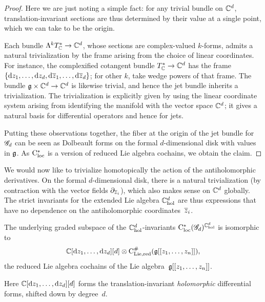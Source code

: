 
\begin{proof}
Here we are just noting a simple fact: 
for any trivial bundle on $\mathbb C^d$, 
translation-invariant sections are thus determined by their value at a single point,
which we can take to be the origin.

Each bundle $\Lambda^k T_\mathbb C^* \to \mathbb C^d$, whose sections are complex-valued $k$-forms, admits a natural trivialization by the frame arising from the choice of linear coordinates. 
For instance, the complexified cotangent bundle $T^*_\mathbb C \to \mathbb C^d$ has the frame $\{{\rm d} z_1,\ldots,{\rm d} z_d, {\rm d} \overline{z}_1,\ldots,{\rm d} \overline{z}_d\}$; for other $k$, take wedge powers of that frame. 
The bundle $\mathfrak g \times \mathbb C^d \to \mathbb C^d$ is likewise trivial,
and hence the jet bundle inherits a trivialization.
The trivialization is explicitly given by using the linear coordinate system arising from identifying the manifold with the vector space $\mathbb C^d$;
it gives a natural basis for differential operators and hence for jets.

Putting these observations together, 
the fiber at the origin of the jet bundle for $\mathscr G_d$ can be seen as Dolbeault forms on the formal $d$-dimensional disk with values in $\mathfrak g$.
As ${\rm C}_{\rm loc}^*$ is a version of reduced Lie algebra cochains, we obtain the claim.
\end{proof}

We would now like to trivialize homotopically the action of the antiholomorphic derivatives.
On the formal $d$-dimensional disk, there is a natural trivialization (by contraction with the vector fields $\partial_{\overline{z}_i}$),
which also makes sense on $\mathbb C^d$ globally.
The strict invariants for the extended Lie algebra $\mathbb C^d_{\rm hol}$ are thus expressions that have no dependence on the antiholomorphic coordinates~$\overline{z}_i$.

\begin{lem}
The underlying graded subspace of the $\mathbb C^d_{\rm hol}$-invariants ${\rm C}_{\rm loc}^*(\mathscr G_d)^{\mathbb C^d_{\rm hol}}$ is isomorphic to 
\[
\mathbb C[{\rm d} z_1,\ldots, {\rm d} z_d][d] \otimes {\rm C}_{\rm Lie, red}^\#(\mathfrak g[[z_1,\ldots,z_n]]),
\]
the reduced Lie algebra cochains of the Lie algebra~$\mathfrak g[[z_1,\ldots,z_n]]$.
\end{lem}

Here $\mathbb C[{\rm d} z_1,\ldots, {\rm d} z_d][d]$ forms the translation-invariant {\em holomorphic} differential forms, 
shifted down by degree~$d$.

